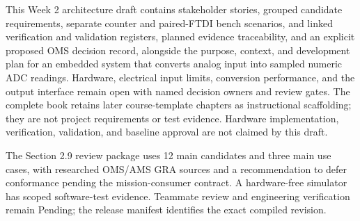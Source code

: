 This Week 2 architecture draft contains stakeholder stories, grouped candidate
requirements, separate counter and paired-FTDI bench scenarios, and linked
verification and validation registers, planned evidence traceability, and an
explicit proposed OMS decision record, alongside the purpose, context, and development plan for an embedded system that converts analog input into
sampled numeric ADC readings. Hardware, electrical input limits, conversion
performance, and the output interface remain open with named decision owners
and review gates. The complete book retains later course-template chapters
as instructional scaffolding; they are not project requirements or test
evidence. Hardware implementation, verification, validation, and baseline
approval are not claimed by this draft.

The Section 2.9 review package uses 12 main candidates and three main use
cases, with researched OMS/AMS GRA sources and a recommendation to defer
conformance pending the mission-consumer contract. A hardware-free simulator
has scoped software-test evidence. Teammate review and engineering verification
remain Pending; the release manifest identifies the exact compiled revision.
